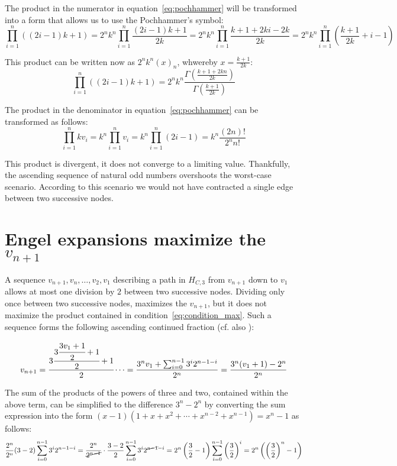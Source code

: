 The product in the numerator in equation~\ref{eq:pochhammer} will be transformed into a form that allows us to use the Pochhammer’s symbol:
\[\prod_{i=1}^{n}\left((2i-1)k+1\right)=2^nk^n\prod_{i=1}^{n}\frac{(2i-1)k+1}{2k}=2^nk^n\prod_{i=1}^{n}\frac{k+1+2ki-2k}{2k}=2^nk^n\prod_{i=1}^{n}\left(\frac{k+1}{2k}+i-1\right)\]

This product can be written now as $2^nk^n(x)_n$, whwereby $x=\frac{k+1}{2k}$:
\[\prod_{i=1}^{n}\left((2i-1)k+1\right)=2^nk^n\frac{\Gamma\left(\frac{k+1+2kn}{2k}\right)}{\Gamma\left(\frac{k+1}{2k}\right)}\]

The product in the denominator in equation~\ref{eq:pochhammer} can be transformed as follows:
\[\prod_{i=1}^{n}kv_i=k^n\prod_{i=1}^{n}v_i=k^n\prod_{i=1}^{n}(2i-1)=k^n\frac{(2n)!}{2^nn!}\]

\par\medskip
This product is divergent, it does not converge to a limiting value. Thankfully, the ascending sequence of natural odd numbers overshoots the worst-case scenario. According to this scenario we would not have contracted a single edge between two successive nodes.

\section{Engel expansions maximize the $v_{n+1}$}
A sequence $v_{n+1},v_n,\ldots,v_2,v_1$ describing a path in $H_{C,3}$ from $v_{n+1}$ down to $v_1$ allows at most one division by $2$ between two successive nodes. Dividing only once between two successive nodes, maximizes the $v_{n+1}$, but it does not maximize the product contained in condition~\ref{eq:condition_max}. Such a sequence forms the following ascending continued fraction (cf. also \cite[p.~11]{Ref_Laarhoven}):

\begin{equation}
\label{eq:asc_continued_fraction}
v_{n+1}=\cfrac{3\cfrac{3\cfrac{3v_1+1}{2}+1}{2}+1}{2}\dotsb
=\frac{3^nv_1+\sum_{i=0}^{n-1}3^i2^{n-1-i}}{2^n}
=\frac{3^n(v_1+1)-2^n}{2^n}
\end{equation}

\par\medskip
The sum of the products of the powers of three and two, contained within the above term, can be simplified to the difference $3^n-2^n$ by converting the sum expression into the form $(x-1)(1+x+x^2+\cdots+x^{n-2}+x^{n-1})=x^n-1$ as follows:
\[
\frac{2^n}{2^n}(3-2)\sum_{i=0}^{n-1}3^i2^{n-1-i}
=\frac{2^n}{\cancel{2^{n-1}}}\cdot\frac{3-2}{2}\sum_{i=0}^{n-1}3^i2^{\cancel{n-1}-i}
=2^n\left(\frac{3}{2}-1\right)\sum_{i=0}^{n-1}\left(\frac{3}{2}\right)^i
=2^n\left(\left(\frac{3}{2}\right)^n-1\right)
\]

